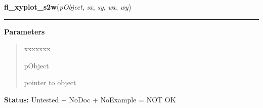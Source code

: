     \label{xformslib:library:fl_xyplot_s2w}

    \vspace{0.5ex}

\hspace{.8\funcindent}\begin{boxedminipage}{\funcwidth}

    \raggedright \textbf{fl\_xyplot\_s2w}(\textit{pObject}, \textit{sx}, \textit{sy}, \textit{wx}, \textit{wy})

    \vspace{-1.5ex}

    \rule{\textwidth}{0.5\fboxrule}
\setlength{\parskip}{2ex}
\setlength{\parskip}{1ex}
      \textbf{Parameters}
      \vspace{-1ex}

      \begin{quote}
        \begin{Ventry}{xxxxxxx}

          \item[pObject]

          pointer to object

        \end{Ventry}

      \end{quote}

\textbf{Status:} Untested + NoDoc + NoExample = NOT OK



    \end{boxedminipage}

    \label{xformslib:library:fl_xyplot_w2s}

    \vspace{0.5ex}

